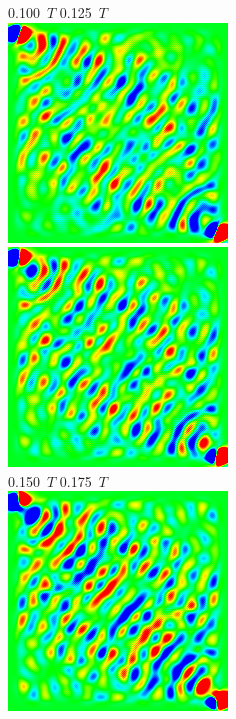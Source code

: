 \documentclass[a4j, twocolumn]{jsarticle}
\begin{document}
\begin{figure}
0.100\ $T$ \hspace*{0.25\hsize} 0.125\ $T$  \vspace{5pt}\\
\includegraphics[width=0.4\hsize]{./figures/capture/sin/sinsqr128_32i_l_dif_5767} \ 
\includegraphics[width=0.4\hsize]{./figures/capture/sin/sinsqr128_32i_l_dif_5768} \\
0.150\ $T$ \hspace*{0.25\hsize} 0.175\ $T$  \vspace{5pt}\\
\includegraphics[width=0.4\hsize]{./figures/capture/sin/sinsqr128_32i_l_dif_5769} \ 

\end{figure}
\end{document}
